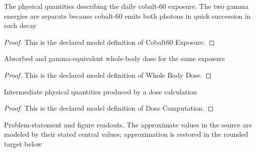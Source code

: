 \begin{definition}
  \label{def:physics:phyx-mini-0619:phyxmini0619-cobalt60exposure}
  The physical quantities describing the daily cobalt-60 exposure. The two gamma energies are separate because cobalt-60 emits both photons in quick succession in each decay
\end{definition}
\begin{proof}
  This is the declared model definition of Cobalt60 Exposure.
\end{proof}
\begin{definition}
  \label{def:physics:phyx-mini-0619:phyxmini0619-wholebodydose}
  Absorbed and gamma-equivalent whole-body dose for the same exposure
\end{definition}
\begin{proof}
  This is the declared model definition of Whole Body Dose.
\end{proof}
\begin{definition}
  \label{def:physics:phyx-mini-0619:phyxmini0619-dosecomputation}
  Intermediate physical quantities produced by a dose calculation
\end{definition}
\begin{proof}
  This is the declared model definition of Dose Computation.
\end{proof}
\begin{definition}
  \label{def:physics:phyx-mini-0619:phyxmini0619-matchesproblemdata}
  Problem-statement and figure readouts. The approximate values in the source are modeled by their stated central values; approximation is restored in the rounded target below
\end{definition}
